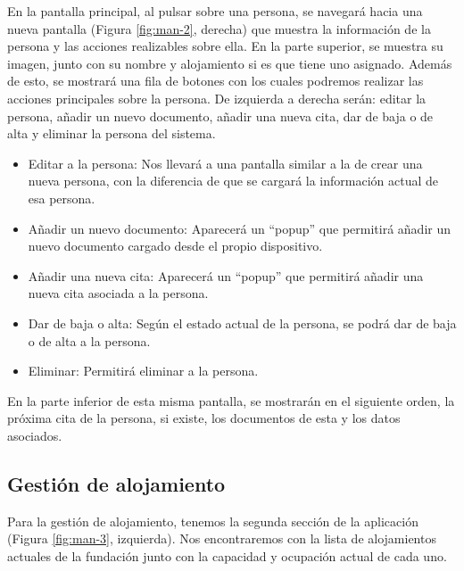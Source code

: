 En la pantalla principal, al pulsar sobre una persona, se navegará hacia una nueva pantalla (Figura \ref{fig:man-2}, derecha) que muestra la información de la persona y las acciones realizables sobre ella. En la parte superior, se muestra su imagen, junto con su nombre y alojamiento si es que tiene uno asignado. Además de esto, se mostrará una fila de botones con los cuales podremos realizar las acciones principales sobre la persona. De izquierda a derecha serán: editar la persona, añadir un nuevo documento, añadir una nueva cita, dar de baja o de alta y eliminar la persona del sistema. 

\begin{itemize}
    \item Editar a la persona: Nos llevará a una pantalla similar a la de crear una nueva persona, con la diferencia de que se cargará la información actual de esa persona.
    \item Añadir un nuevo documento: Aparecerá un ``popup'' que permitirá añadir un nuevo documento cargado desde el propio dispositivo.
    \item Añadir una nueva cita: Aparecerá un ``popup'' que permitirá añadir una nueva cita asociada a la persona.
    \item Dar de baja o alta: Según el estado actual de la persona, se podrá dar de baja o de alta a la persona.
    \item Eliminar: Permitirá eliminar a la persona.
\end{itemize}

En la parte inferior de esta misma pantalla, se mostrarán en el siguiente orden, la próxima cita de la persona, si existe, los documentos de esta y los datos asociados.

\subsection{Gestión de alojamiento}

Para la gestión de alojamiento, tenemos la segunda sección de la aplicación (Figura \ref{fig:man-3}, izquierda). Nos encontraremos con la lista de alojamientos actuales de la fundación junto con la capacidad y ocupación actual de cada uno. 

